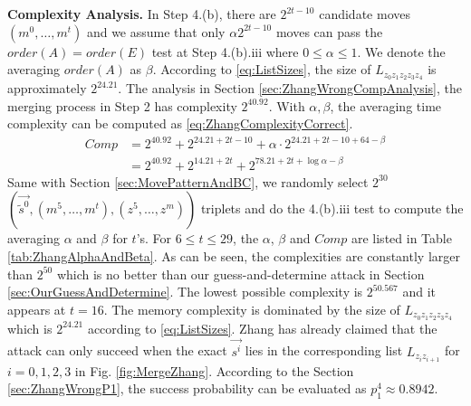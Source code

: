 \noindent\textbf{Complexity Analysis. }
In Step 4.(b), there are $2^{2t-10}$ candidate moves $(m^0,\ldots, m^{t})$ and we assume that only $\alpha 2^{2t-10}$ moves can pass the $order(A)=order(E)$ test at Step 4.(b).iii where $0\leq \alpha \leq 1$.
We denote the averaging $order(A)$ as $\beta $.
According to \eqref{eq:ListSizes}, the size of $L_{z_0z_1z_2z_3z_4}$ is approximately $2^{24.21}$.
The analysis in Section \ref{sec:ZhangWrongCompAnalysis}, the merging process in Step 2 has complexity $2^{40.92}$.
With $\alpha ,\beta $, the averaging time complexity can be computed as \eqref{eq:ZhangComplexityCorrect}.
\begin{equation}\label{eq:ZhangComplexityCorrect}
\begin{aligned}
Comp&=2^{40.92}+2^{24.21+2t-10}+\alpha \cdot 2^{24.21+2t-10+64-\beta}\\
&=2^{40.92}+2^{14.21+2t}+2^{78.21+2t+\log \alpha -\beta}
\end{aligned}
\end{equation}
Same with Section \ref{sec:MovePatternAndBC}, we randomly select $2^{30}$ $\left(\vec{\tilde{s}^0}, (m^5,\ldots, m^t), (z^5,\ldots, z^m)\right)$ triplets and do the 4.(b).iii test to compute the averaging $\alpha$ and $\beta$ for $t$'s.
For $6\leq t\leq 29$, the $\alpha$, $\beta$ and $Comp$ are listed in Table \ref{tab:ZhangAlphaAndBeta}.
As can be seen, the complexities are constantly larger than $2^{50}$ which is no better than our guess-and-determine attack in Section \ref{sec:OurGuessAndDetermine}.
The lowest possible complexity is $2^{50.567}$ and it appears at $t=16$.
The memory complexity is dominated by the size of $L_{z_0z_1z_2z_3z_4}$ which is $2^{24.21}$ according to \eqref{eq:ListSizes}.
Zhang \etal has already claimed that the attack can only succeed when the exact $\vec{s^i}$ lies in the corresponding list $L_{z_iz_{i+1}}$ for $i=0,1,2,3$ in Fig. \ref{fig:MergeZhang}.
According to the Section \ref{sec:ZhangWrongP1}, the success probability can be evaluated as $p_1^4\approx 0.8942$.


